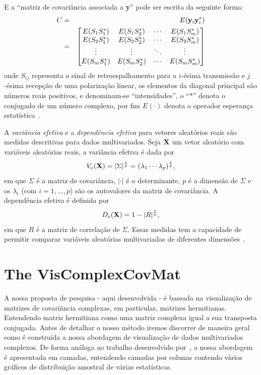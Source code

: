 \documentclass[journal]{IEEEtran}
\begin{document}
E a ``matriz de covariância associada a {\bf y}'' pode ser escrita da seguinte forma:
{\small
\begin{eqnarray}
C &=& E({\bf y}_{i}{\bf y}_{i}^{*}) \nonumber \\
  &=& \begin{bmatrix}
	E(S_{1}S_{1}^{*})	&	E(S_{1}S_{2}^{*})	&	\cdots	&	E(S_{1}S_{m}^{*})\\
	E(S_{2}S_{1}^{*})	&	E(S_{2}S_{2}^{*})	&	\cdots	&	E(S_{2}S_{m}^{*})\\
		\vdots			&			\vdots		&	\ddots	&		\vdots		\\
	E(S_{m}S_{1}^{*})	&	E(S_{m}S_{2}^{*})	&	\cdots	&	E(S_{m}S_{m}^{*})
	  \end{bmatrix}		
\end{eqnarray}}
onde $S_{ij}$ representa o sinal de retroespalhamento para a $i$-ésima transmissão e $j$-ésima recepção de uma polarização linear, os elementos da diagonal principal são números reais positivos, e {denominam-se} ``intensidades''\label{intensidades}, o ``$*$'' denota o conjugado de um número complexo, por fim $E(\cdot)$ denota o operador esperança estatística~\cite{Lee-2009,Nascimento-2014}.

A \textit{variância efetiva} e a \textit{dependência efetiva} para vetores aleatórios reais são medidas descritivas para dados multivariados.  Seja ${\bf X}$ um vetor aleatório com variáveis aleatórias reais, a variância efetiva é dada por
$$V_{e}({\bf X})=\vert \Sigma \vert^{\frac{1}{p}}=(\lambda_{1}\cdots \lambda_{p})^{\frac{1}{p}},$$
em que $\Sigma$ é a matriz de covariância, $\vert \cdot \vert$ é o determinante, $p$ é a dimensão de $\Sigma$ e os $\lambda_{i}$ (com $i=1,\ldots, p$) são os autovalores da matriz de covariância. A dependência efetiva é definida por
$$D_{e}({\bf X})= 1-\vert R \vert^{\frac{1}{p}}, $$
em que $R$ é a matriz de correlação de $\Sigma$. 
Essas medidas tem a capacidade de permitir comparar variáveis aleatórias multivariadas de diferentes dimensões~\cite{Pena-2003}. 

\section{The VisComplexCovMat}\label{tres}

A nossa proposta de pesquisa - aqui desenvolvida - é baseada na visualização de matrizes de covariância complexas, em particular, matrizes hermitianas. Entendendo matriz hermitiana como uma matriz complexa igual a sua transposta conjugada. Antes de detalhar o nosso método iremos discorrer de maneira geral como é construída a nossa abordagem de visualização de dados multivariados complexos. De forma análoga ao trabalho desenvolvido por~\cite{tokuda-2011}, a nossa abordagem é apresentada em camadas, entendendo camadas por colunas contendo vários gráficos de distribuição amostral de várias estatísticas.
\end{document}
